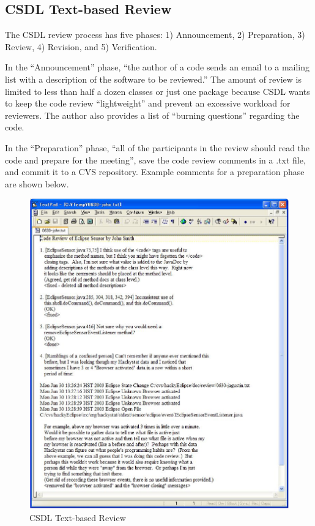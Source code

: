 \subsection{CSDL Text-based Review}
\label{subsec:csdl-text-based-review}

The CSDL review process has five phases: 1) Announcement, 2) Preparation, 3) Review, 4) Revision, and 5) Verification.

In the ``Announcement'' phase, ``the author of a code sends an email to a mailing list with a description of the software to be reviewed.'' The amount of review is limited to less than half a dozen classes or just one package because CSDL wants to keep the code review ``lightweight'' and prevent an excessive workload for reviewers. The author also provides a list of ``burning questions'' regarding the code.

In the ``Preparation'' phase, ``all of the participants in the review should read the code and prepare for the meeting'', save the code review comments in a .txt file, and commit it to a CVS repository. Example comments for a preparation phase are shown below.

\begin{figure}[htbp]
  \centering
  \includegraphics{images/fig3-39.eps}
  \caption{CSDL Text-based Review}
  \label{fig3-39}
\end{figure}

